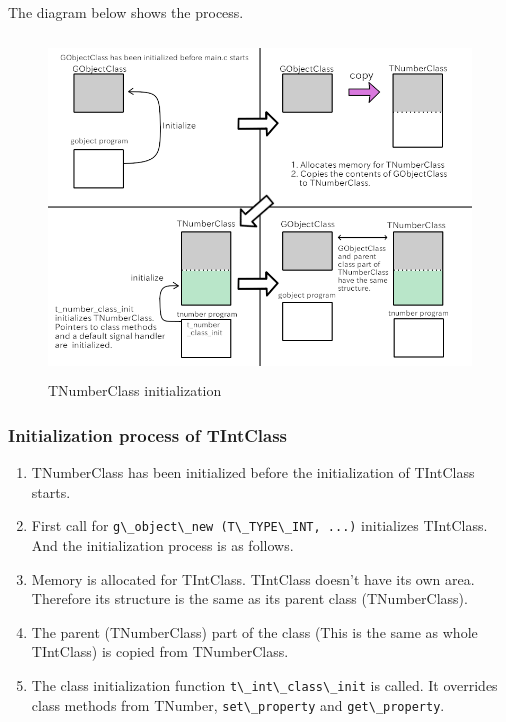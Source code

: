 The diagram below shows the process.

\begin{figure}
\centering
\includegraphics[width=12cm,height=9cm]{../image/tnumberclass_init.png}
\caption{TNumberClass initialization}
\end{figure}

\subsubsection{Initialization process of
TIntClass}\label{initialization-process-of-tintclass}

\begin{enumerate}
\def\labelenumi{\arabic{enumi}.}
\tightlist
\item
  TNumberClass has been initialized before the initialization of
  TIntClass starts.
\item
  First call for
  \passthrough{\lstinline!g\_object\_new (T\_TYPE\_INT, ...)!}
  initializes TIntClass. And the initialization process is as follows.
\item
  Memory is allocated for TIntClass. TIntClass doesn't have its own
  area. Therefore its structure is the same as its parent class
  (TNumberClass).
\item
  The parent (TNumberClass) part of the class (This is the same as whole
  TIntClass) is copied from TNumberClass.
\item
  The class initialization function
  \passthrough{\lstinline!t\_int\_class\_init!} is called. It overrides
  class methods from TNumber, \passthrough{\lstinline!set\_property!}
  and \passthrough{\lstinline!get\_property!}.
\end{enumerate}

